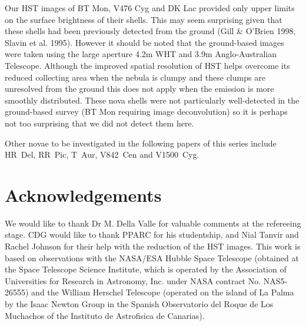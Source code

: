 Our HST images of BT Mon, V476 Cyg and DK Lac provided only upper
limits on the surface brightness of their shells. This may seem
surprising given that these shells had been previously detected from
the ground (Gill \& O'Brien 1998, Slavin et al. 1995). However it
should be noted that the ground-based images were taken using the large 
aperture 4.2m WHT and 3.9m Anglo-Australian Telescope.  Although the improved
spatial resolution of HST helps overcome its reduced collecting area when
the nebula is clumpy and these clumps are unresolved from the ground
this does not apply when the emission is more smoothly distributed. These 
nova shells were not particularly well-detected in the ground-based survey
(BT Mon requiring image deconvolution) so it is perhaps not too 
surprising that we did not detect them here.

Other novae to be investigated in the following papers of this series include
HR~Del, RR~Pic, T~Aur, V842~Cen and V1500~Cyg. 

\section {Acknowledgements}
We would like to thank Dr M. Della Valle for valuable comments at
the refereeing stage. CDG would like to thank PPARC for his
studentship, and Nial Tanvir and Rachel Johnson for their help with
the reduction of the HST images.  This work is based on observations
with the NASA/ESA Hubble Space Telescope (obtained at the Space
Telescope Science Institute, which is operated by the Association of
Universities for Research in Astronomy, Inc. under NASA contract
No. NAS5-26555) and the William Herschel Telescope (operated on the
island of La Palma by the Isaac Newton Group in the Spanish
Observatorio del Roque de Los Muchachos of the Instituto de
Astrofisica de Canarias).

